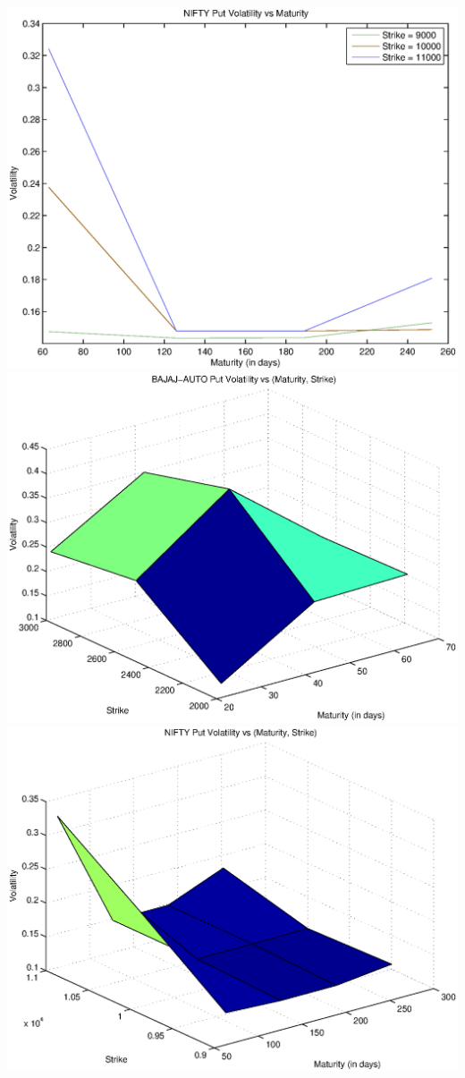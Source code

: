 \documentclass{article}
\begin{document}
\includegraphics[width=\textwidth]{NIFTY_Put_Volatility_vs_Maturity} \\
\includegraphics[width=\textwidth]{BAJAJ-AUTO_Put_Volatility_vs_(Maturity,_Strike)} \\     
\includegraphics[width=\textwidth]{NIFTY_Put_Volatility_vs_(Maturity,_Strike)} \\
\end{document}
